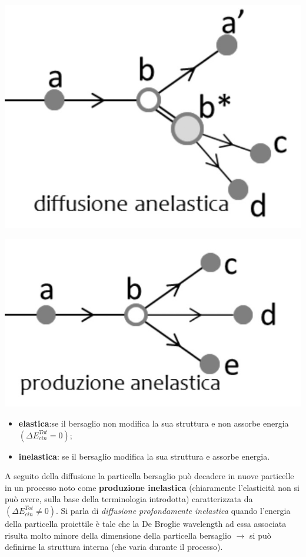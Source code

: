 \begin{marginfigure}
	\includegraphics{figs/diffusione-anelastica}
	\label{fig:diffusione-anelastica}
\end{marginfigure}

\begin{marginfigure}
	\includegraphics{figs/produzione-anelastica}
	\label{fig:produzione-anelastica}
\end{marginfigure}

\begin{itemize}
	\item \textbf{elastica}:se il bersaglio non modifica la sua struttura e non assorbe
	energia$ \left( \Delta E^{Tot}_{cin} = 0 \right)$;
	\item \textbf{inelastica}: se il bersaglio modifica la sua struttura e assorbe energia.
\end{itemize}
A seguito della diffusione la particella bersaglio può decadere in nuove particelle in un processo noto come
\textbf{produzione inelastica} (chiaramente l'elasticità non si può avere, sulla base della terminologia introdotta)
caratterizzata da $\left( \Delta E^{Tot}_{cin} \neq 0 \right)$.
Si parla di \emph{diffusione profondamente inelastica} quando l'energia
della particella proiettile è tale che la De Broglie wavelength ad essa
associata risulta molto minore della dimensione della particella
bersaglio $ \rightarrow$ si può definirne la struttura interna (che
varia durante il processo).

